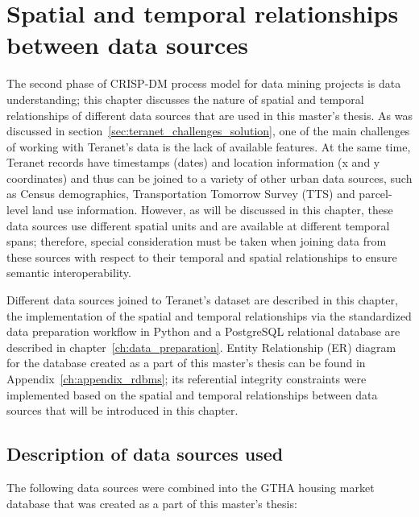 \chapter{Spatial and temporal relationships between data sources} \label{ch:spatial_and_temporal_relationships}

The second phase of CRISP-DM process model for data mining projects is data understanding;
this chapter discusses the nature of spatial and temporal relationships of different data sources that are used in this master's thesis.
As was discussed in section~\ref{sec:teranet_challenges_solution}, one of the main challenges of working with Teranet's data is the lack of available features.
At the same time, Teranet records have timestamps (dates) and location information (x and y coordinates) and thus can be joined to a variety of other urban data sources, such as Census demographics, Transportation Tomorrow Survey (TTS) and parcel-level land use information.
However, as will be discussed in this chapter, these data sources use different spatial units and are available at different temporal spans;
therefore, special consideration must be taken when joining data from these sources with respect to their temporal and spatial relationships to ensure semantic interoperability.

Different data sources joined to Teranet's dataset are described in this chapter, the implementation of the spatial and temporal relationships via the standardized data preparation workflow in Python and a PostgreSQL relational database are described in chapter~\ref{ch:data_preparation}.
Entity Relationship (ER) diagram for the database created as a part of this master's thesis can be found in Appendix~\ref{ch:appendix_rdbms};
its referential integrity constraints were implemented based on the spatial and temporal relationships between data sources that will be introduced in this chapter.

\section{Description of data sources used} \label{sec:description_of_data_sources}

The following data sources were combined into the GTHA housing market database that was created as a part of this master's thesis:

